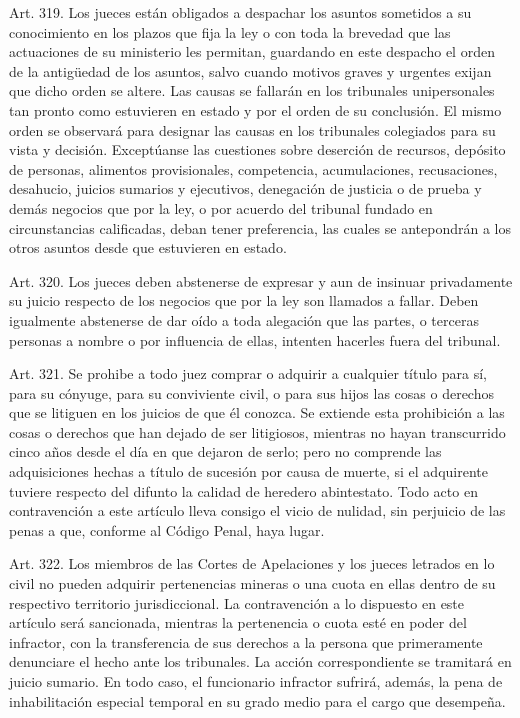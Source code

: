     Art. 319. Los jueces están obligados a despachar los asuntos sometidos a su conocimiento en los plazos que fija la ley o con toda la brevedad que las actuaciones de su ministerio les permitan, guardando en este despacho el orden de la antigüedad de los asuntos, salvo cuando motivos graves y urgentes exijan que dicho orden se altere.
    Las causas se fallarán en los tribunales unipersonales tan pronto como estuvieren en estado y por el orden de su conclusión. El mismo orden se observará para designar las causas en los tribunales colegiados para su vista y decisión.
    Exceptúanse las cuestiones sobre deserción de recursos, depósito de personas, alimentos provisionales, competencia, acumulaciones, recusaciones, desahucio, juicios sumarios y ejecutivos, denegación de justicia o de prueba y demás negocios que por la ley, o por acuerdo del tribunal fundado en circunstancias calificadas, deban tener preferencia, las cuales se antepondrán a los otros asuntos desde que estuvieren en estado.


    Art. 320. Los jueces deben abstenerse de expresar y aun de insinuar privadamente su juicio respecto de los negocios que por la ley son llamados a fallar.
    Deben igualmente abstenerse de dar oído a toda alegación que las partes, o terceras personas a nombre o por influencia de ellas, intenten hacerles fuera del tribunal.


    Art. 321. Se prohibe a todo juez comprar o adquirir a cualquier título para sí, para su cónyuge, para su conviviente civil, o para sus hijos las cosas o derechos que se litiguen en los juicios de que él conozca.
    Se extiende esta prohibición a las cosas o derechos que han dejado de ser litigiosos, mientras no hayan transcurrido cinco años desde el día en que dejaron de serlo; pero no comprende las adquisiciones hechas a título de sucesión por causa de muerte, si el adquirente tuviere respecto del difunto la calidad de heredero abintestato.
    Todo acto en contravención a este artículo lleva consigo el vicio de nulidad, sin perjuicio de las penas a que, conforme al Código Penal, haya lugar.



    Art. 322. Los miembros de las Cortes de Apelaciones y los jueces letrados en lo civil no pueden adquirir pertenencias mineras o una cuota en ellas dentro de su respectivo territorio jurisdiccional.
    La contravención a lo dispuesto en este artículo será sancionada, mientras la pertenencia o cuota esté en poder del infractor, con la transferencia de sus derechos a la persona que primeramente denunciare el hecho ante los tribunales. La acción correspondiente se tramitará en juicio sumario.
    En todo caso, el funcionario infractor sufrirá, además, la pena de inhabilitación especial temporal en su grado medio para el cargo que desempeña.


